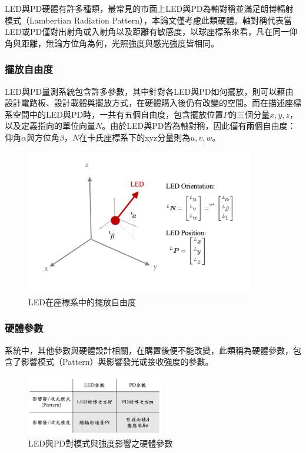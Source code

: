     LED與PD硬體有許多種類，最常見的市面上LED與PD為軸對稱並滿足朗博輻射模式（Lambertian Radiation Pattern），本論文僅考慮此類硬體。軸對稱代表當LED或PD僅對出射角或入射角以及距離有敏感度，以球座標系來看，凡在同一仰角與距離，無論方位角為何，光照強度與感光強度皆相同。

    
        

        \subsubsection{擺放自由度}

        LED與PD量測系統包含許多參數，其中針對各LED與PD如何擺放，則可以藉由設計電路板、設計載體與擺放方式，在硬體購入後仍有改變的空間。而在描述座標系空間中的LED與PD時，一共有五個自由度，包含擺放位置$P$的三個分量$x,y,z$，以及定義指向的單位向量$N$。由於LED與PD皆為軸對稱，因此僅有兩個自由度：仰角$\alpha$與方位角$\beta$，$N$在卡氏座標系下的xyz分量則為$u,v,w$。


        \begin{figure}[ht]
            \centering
            \includegraphics[width=10cm]{ch2pic/LED_config.png}
            \caption{LED在座標系中的擺放自由度}
            \label{pic:led_config}
        \end{figure}


        \subsubsection{硬體參數}

        系統中，其他參數與硬體設計相關，在購置後便不能改變，此類稱為硬體參數，包含了影響模式（Pattern）與影響發光或接收強度的參數。

        \begin{figure}[ht]
            \caption{LED與PD對模式與強度影響之硬體參數}
            \label{tab:hardwarepara}
            \centering
            \includegraphics[width=6cm]{ch2pic/tab_hardwarepara.png}
        \end{figure}


